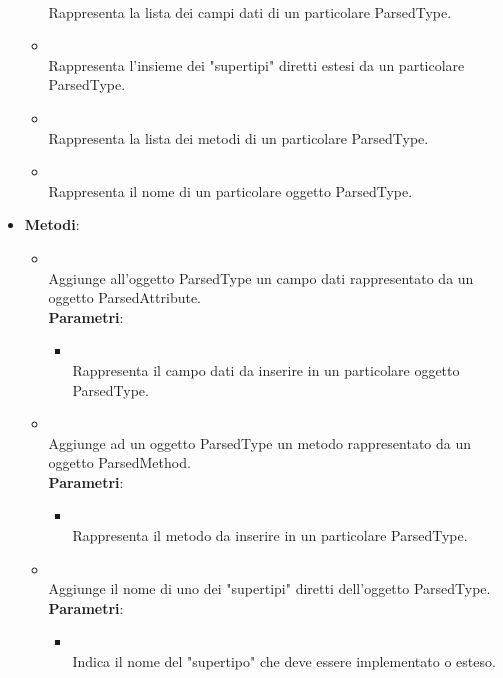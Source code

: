 \begin{itemize}
\begin{itemize}
\\ Rappresenta la lista dei campi dati di un particolare ParsedType.
\item {}
\\ Rappresenta l'insieme dei "supertipi" diretti estesi da un particolare ParsedType.
\item {}
\\ Rappresenta la lista dei metodi di un particolare ParsedType.
\item {}
\\ Rappresenta il nome di un particolare oggetto ParsedType.
\end{itemize}
\item \textbf{Metodi}:
\begin{itemize}
\item {}
\\ Aggiunge all'oggetto ParsedType un campo dati rappresentato da un oggetto ParsedAttribute.
\\ \textbf{Parametri}:
\begin{itemize}
\item {}
\\ Rappresenta il campo dati da inserire in un particolare oggetto ParsedType.
\end{itemize}
\item {}
\\ Aggiunge ad un oggetto ParsedType un metodo rappresentato da un oggetto ParsedMethod.
\\ \textbf{Parametri}:
\begin{itemize}
\item {}
\\ Rappresenta il metodo da inserire in un particolare ParsedType.
\end{itemize}
\item {}
\\ Aggiunge il nome di uno dei "supertipi" diretti dell'oggetto ParsedType.
\\ \textbf{Parametri}:
\begin{itemize}
\item {}
\\ Indica il nome del "supertipo" che deve essere implementato o esteso.

\end{itemize}
\end{itemize}
\end{itemize}
